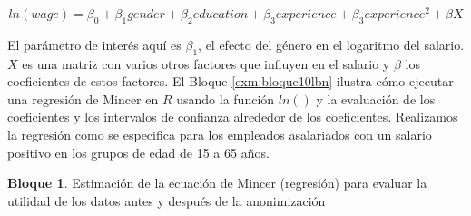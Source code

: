 \documentclass[]{book}
\theoremstyle{definition}
\theoremstyle{definition}
\newtheorem{example}{Bloque}[chapter]
\theoremstyle{definition}
\theoremstyle{definition}
\theoremstyle{remark}
\begin{document}
\[ln(wage)=β_0+β_1gender+β_2education+β_3experience+β_3experience^2+βX\]

El parámetro de interés aquí es \(β_1\), el efecto del género en el logaritmo del salario. \(X\) es una matriz con varios otros factores que influyen en el salario y \(β\) los coeficientes de estos factores. El Bloque \ref{exm:bloque10lbn} ilustra cómo ejecutar una regresión de Mincer en \(R\) usando la función \(ln()\) y la evaluación de los coeficientes y los intervalos de confianza alrededor de los coeficientes. Realizamos la regresión como se especifica para los empleados asalariados con un salario positivo en los grupos de edad de
15 a 65 años.

\begin{example}
\protect\hypertarget{exm:bloque10lbn}{}{\label{exm:bloque10lbn} }Estimación de la ecuación de Mincer (regresión) para evaluar la utilidad de los datos antes y después de la anonimización
\end{example}
\end{document}
